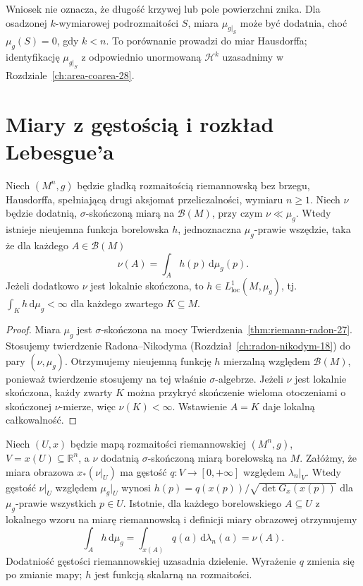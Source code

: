 \begin{uwaga}
Wniosek nie oznacza, że długość krzywej lub pole
powierzchni znika. Dla osadzonej $k$-wymiarowej
podrozmaitości $S$, miara $\mu_{g|_S}$ może być
dodatnia, choć $\mu_g(S)=0$, gdy $k<n$.
To porównanie prowadzi do miar Hausdorffa;
identyfikację $\mu_{g|_S}$ z odpowiednio
unormowaną $\mathcal H^k$ uzasadnimy
w Rozdziale~\ref{ch:area-coarea-28}.
\end{uwaga}

\section{Miary z gęstością i rozkład Lebesgue'a}
\begin{twierdzenie}
\label{thm:rn-manifold-27}
Niech $(M^n,g)$ będzie gładką rozmaitością riemannowską
bez brzegu, Hausdorffa, spełniającą drugi aksjomat przeliczalności,
wymiaru $n\ge1$. Niech
$\nu$ będzie dodatnią, $\sigma$-skończoną
miarą na $\mathcal B(M)$, przy czym
$\nu\ll\mu_g$. Wtedy istnieje nieujemna funkcja
borelowska $h$, jednoznaczna $\mu_g$-prawie
wszędzie, taka że dla każdego $A\in\mathcal B(M)$
\[
 \nu(A)=\int_A h(p)\,\mathrm d\mu_g(p).
\]
Jeżeli dodatkowo $\nu$ jest lokalnie skończona,
to $h\in L^1_{\mathrm{loc}}(M,\mu_g)$,
tj. $\int_K h\,\mathrm d\mu_g<\infty$
dla każdego zwartego $K\subseteq M$.
\end{twierdzenie}
\begin{proof}
Miara $\mu_g$ jest $\sigma$-skończona na mocy
Twierdzenia~\ref{thm:riemann-radon-27}.
Stosujemy twierdzenie Radona--Nikodyma
(Rozdział~\ref{ch:radon-nikodym-18})
do pary $(\nu,\mu_g)$. Otrzymujemy nieujemną funkcję $h$ mierzalną względem $\mathcal B(M)$,
ponieważ twierdzenie stosujemy na tej właśnie $\sigma$-algebrze. Jeżeli $\nu$ jest lokalnie
skończona, każdy zwarty $K$ można przykryć
skończenie wieloma otoczeniami o skończonej
$\nu$-mierze, więc $\nu(K)<\infty$.
Wstawienie $A=K$ daje lokalną całkowalność.
\end{proof}

\begin{przyklad}
Niech $(U,x)$ będzie mapą rozmaitości riemannowskiej
$(M^n,g)$, $V=x(U)\subseteq\mathbb R^n$, a $\nu$ dodatnią
$\sigma$-skończoną miarą borelowską na $M$.
Załóżmy, że miara obrazowa $x_*(\nu|_U)$ ma gęstość
$q:V\to[0,+\infty]$ względem $\lambda_n|_V$.
Wtedy gęstość $\nu|_U$ względem $\mu_g|_U$ wynosi
$h(p)=q(x(p))/\sqrt{\det G_x(x(p))}$ dla
$\mu_g$-prawie wszystkich $p\in U$. Istotnie, dla każdego
borelowskiego $A\subseteq U$ z lokalnego wzoru na miarę
riemannowską i definicji miary obrazowej otrzymujemy
\[
 \int_A h\,\mathrm d\mu_g
 =\int_{x(A)}q(a)\,\mathrm d\lambda_n(a)=\nu(A).
\]
Dodatniość gęstości riemannowskiej uzasadnia dzielenie.
Wyrażenie $q$ zmienia się po zmianie mapy;
$h$ jest funkcją skalarną na rozmaitości.
\end{przyklad}

